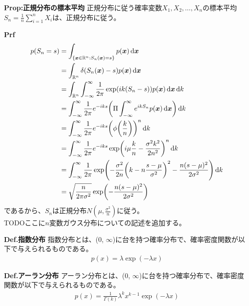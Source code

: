 \documentclass[a4paper,11pt]{jsarticle}
\numberwithin{equation}{section}
\begin{document}
\begin{itembox}[l]{\textbf{Prop:正規分布の標本平均}}
  正規分布に従う確率変数$X_1, X_2, \dots, X_n$の標本平均$S_n = \frac{1}{n}\sum_{i=1}^{n}X_i$は、正規分布に従う。
\end{itembox}
\textbf{Prf}\\
\begin{align}
  p(S_n = s) &= \int_{\{\vb*{x} \in \mathbb{R}^n : S_n(\vb*{x}) = s\}} p(\vb*{x}) \dd{\vb*{x}} \\
  &= \int_{\mathbb{R}^n} \delta(S_n(\vb*{x}) - s) p(\vb*{x}) \dd{\vb*{x}} \\
  &= \int_{\mathbb{R}^n} \int_{-\infty}^{\infty} \frac{1}{2\pi} \exp(ik(S_n-s)) p(\vb*{x}) \dd{\vb*{x}} \dd{k} \\
  &= \int_{-\infty}^{\infty} \frac{1}{2\pi} e^{-iks} \qty(\Pi \int_{-\infty}^{\infty} e^{ikS_n} p(\vb*{x}) \dd{\vb*{x}}) \dd{k} \\
  &= \int_{-\infty}^{\infty} \frac{1}{2\pi} e^{-iks} \qty(\phi\qty(\frac{k}{n}))^n \dd{k} \\
  &= \int_{-\infty}^{\infty} \frac{1}{2\pi} e^{-iks} \exp(i\mu \frac{k}{n} - \frac{\sigma^2 k^2}{2n^2})^n \dd{k} \\
  &= \int_{-\infty}^{\infty} \frac{1}{2\pi} \exp(-\frac{\sigma^2 }{2n}\qty(k - n\frac{s-\mu}{\sigma^2})^2 - \frac{n(s-\mu)^2}{2\sigma^2}) \dd{k} \\
  &= \sqrt{\frac{n}{{2\pi \sigma^2}}} \exp(-\frac{n(s-\mu)^2}{2\sigma^2})
\end{align}
であるから、$S_n$は正規分布$N(\mu, \frac{\sigma^2}{n})$に従う。\hfill\qedsymbol\\

TODOここに$n$変数ガウス分布についての記述を追加する。\\

\begin{itembox}[l]{\textbf{Def.指数分布}}
  指数分布とは、(0, $\infty$)に台を持つ確率分布で、確率密度関数が以下で与えられるものである。
  \begin{align}
    p(x) = \lambda \exp(-\lambda x)
  \end{align}
\end{itembox}

\begin{itembox}[l]{\textbf{Def.アーラン分布}}
  アーラン分布とは、(0, $\infty$)に台を持つ確率分布で、確率密度関数が以下で与えられるものである。
  \begin{align}
    p(x) = \frac{1}{\Gamma(k)}\lambda^k x^{k-1} \exp(-\lambda x)
  \end{align}
\end{itembox}
\end{document}
